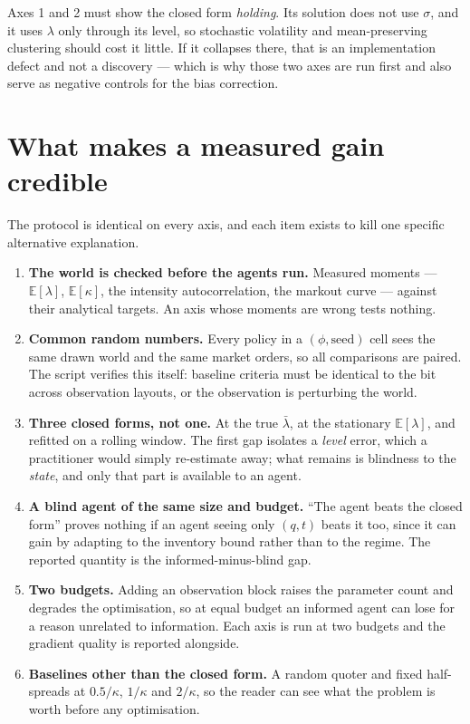 \documentclass[11pt,a4paper]{article}
\begin{document}
Axes 1 and 2 must show the closed form \emph{holding}. Its solution does not use
$\sigma$, and it uses $\lambda$ only through its level, so stochastic volatility
and mean-preserving clustering should cost it little. If it collapses there, that
is an implementation defect and not a discovery --- which is why those two axes
are run first and also serve as negative controls for the bias correction.

\section{What makes a measured gain credible}

The protocol is identical on every axis, and each item exists to kill one specific
alternative explanation.

\begin{enumerate}[label=\arabic*.]
\item \textbf{The world is checked before the agents run.} Measured moments ---
  $\mathbb{E}[\lambda]$, $\mathbb{E}[\kappa]$, the intensity autocorrelation, the
  markout curve --- against their analytical targets. An axis whose moments are
  wrong tests nothing.
\item \textbf{Common random numbers.} Every policy in a $(\phi,\text{seed})$ cell
  sees the same drawn world and the same market orders, so all comparisons are
  paired. The script verifies this itself: baseline criteria must be identical to
  the bit across observation layouts, or the observation is perturbing the world.
\item \textbf{Three closed forms, not one.} At the true $\bar\lambda$, at the
  stationary $\mathbb{E}[\lambda]$, and refitted on a rolling window. The first gap
  isolates a \emph{level} error, which a practitioner would simply re-estimate
  away; what remains is blindness to the \emph{state}, and only that part is
  available to an agent.
\item \textbf{A blind agent of the same size and budget.} ``The agent beats the
  closed form'' proves nothing if an agent seeing only $(q,t)$ beats it too, since
  it can gain by adapting to the inventory bound rather than to the regime. The
  reported quantity is the informed-minus-blind gap.
\item \textbf{Two budgets.} Adding an observation block raises the parameter count
  and degrades the optimisation, so at equal budget an informed agent can lose for
  a reason unrelated to information. Each axis is run at two budgets and the
  gradient quality is reported alongside.
\item \textbf{Baselines other than the closed form.} A random quoter and fixed
  half-spreads at $0.5/\kappa$, $1/\kappa$ and $2/\kappa$, so the reader can see
  what the problem is worth before any optimisation.
\end{enumerate}
\end{document}
